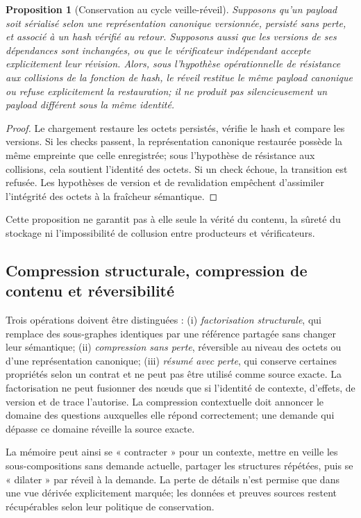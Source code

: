 \documentclass[11pt,a4paper]{article}
\theoremstyle{definition}
\theoremstyle{plain}
\newtheorem{proposition}[definition]{Proposition}
\theoremstyle{remark}
\begin{document}
\begin{proposition}[Conservation au cycle veille-réveil]
Supposons qu'un payload soit sérialisé selon une représentation canonique versionnée, persisté sans perte, et associé à un hash vérifié au retour. Supposons aussi que les versions de ses dépendances sont inchangées, ou que le vérificateur indépendant accepte explicitement leur révision. Alors, sous l'hypothèse opérationnelle de résistance aux collisions de la fonction de hash, le réveil restitue le même payload canonique ou refuse explicitement la restauration; il ne produit pas silencieusement un payload différent sous la même identité.
\end{proposition}
\begin{proof}
Le chargement restaure les octets persistés, vérifie le hash et compare les versions. Si les checks passent, la représentation canonique restaurée possède la même empreinte que celle enregistrée; sous l'hypothèse de résistance aux collisions, cela soutient l'identité des octets. Si un check échoue, la transition est refusée. Les hypothèses de version et de revalidation empêchent d'assimiler l'intégrité des octets à la fraîcheur sémantique.
\end{proof}
Cette proposition ne garantit pas à elle seule la vérité du contenu, la sûreté du stockage ni l'impossibilité de collusion entre producteurs et vérificateurs.

\subsection{Compression structurale, compression de contenu et réversibilité}
Trois opérations doivent être distinguées : (i) \emph{factorisation structurale}, qui remplace des sous-graphes identiques par une référence partagée sans changer leur sémantique; (ii) \emph{compression sans perte}, réversible au niveau des octets ou d'une représentation canonique; (iii) \emph{résumé avec perte}, qui conserve certaines propriétés selon un contrat et ne peut pas être utilisé comme source exacte. La factorisation ne peut fusionner des nœuds que si l'identité de contexte, d'effets, de version et de trace l'autorise. La compression contextuelle doit annoncer le domaine des questions auxquelles elle répond correctement; une demande qui dépasse ce domaine réveille la source exacte.

La mémoire peut ainsi se « contracter » pour un contexte, mettre en veille les sous-compositions sans demande actuelle, partager les structures répétées, puis se « dilater » par réveil à la demande. La perte de détails n'est permise que dans une vue dérivée explicitement marquée; les données et preuves sources restent récupérables selon leur politique de conservation.
\end{document}
